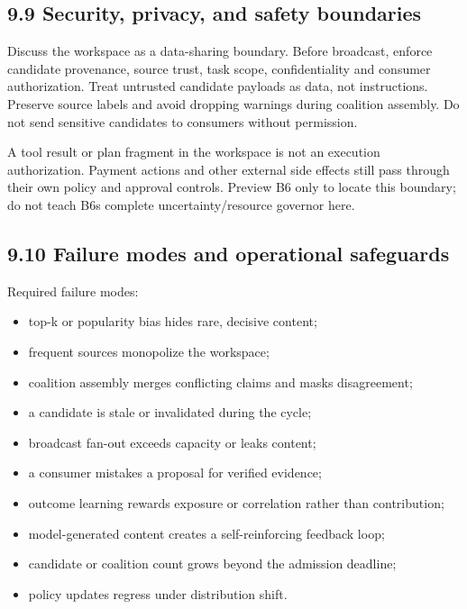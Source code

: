 \subsection{9.9 Security, privacy, and safety boundaries}\label{99-security-privacy-and-safety-boundaries}

Discuss the workspace as a data-sharing boundary. Before broadcast, enforce candidate provenance, source trust, task scope, confidentiality and consumer authorization. Treat untrusted candidate payloads as data, not instructions. Preserve source labels and avoid dropping warnings during coalition assembly. Do not send sensitive candidates to consumers without permission.

A tool result or plan fragment in the workspace is not an execution authorization. Payment actions and other external side effects still pass through their own policy and approval controls. Preview B6 only to locate this boundary; do not teach B6\textquotesingle s complete uncertainty/resource governor here.

\subsection{9.10 Failure modes and operational safeguards}\label{910-failure-modes-and-operational-safeguards}

Required failure modes:

\begin{itemize}
\tightlist
\item
  top-k or popularity bias hides rare, decisive content;
\item
  frequent sources monopolize the workspace;
\item
  coalition assembly merges conflicting claims and masks disagreement;
\item
  a candidate is stale or invalidated during the cycle;
\item
  broadcast fan-out exceeds capacity or leaks content;
\item
  a consumer mistakes a proposal for verified evidence;
\item
  outcome learning rewards exposure or correlation rather than contribution;
\item
  model-generated content creates a self-reinforcing feedback loop;
\item
  candidate or coalition count grows beyond the admission deadline;
\item
  policy updates regress under distribution shift.
\end{itemize}

